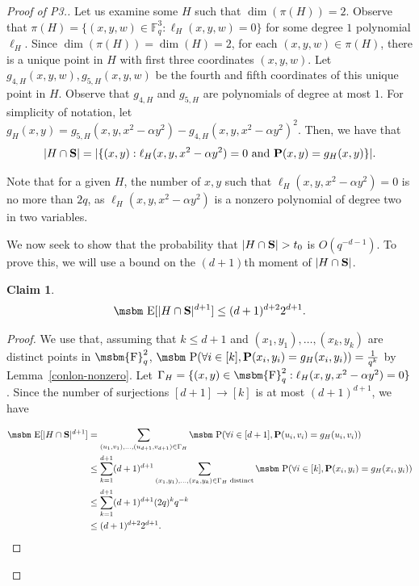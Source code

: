 \documentclass[12pt]{article}
\newtheorem{claim}[theorem]{Claim}
\newcommand{\FF}{\mbox{\msbm{F}}}
\newcommand{\PP}{\mbox{\msbm P}}
\newcommand{\EE}{\mbox{\msbm E}}
\begin{document}
\begin{proof}[Proof of P3.] Let us examine some $H$ such that $\dim(\pi(H)) = 2$. Observe that $\pi(H)=\{(x,y,w)\in \mathbb{F}_q^3: \ell_H(x,y,w)=0\}$ for some degree $1$ polynomial $\ell_H$. Since $\dim(\pi(H)) = \dim(H) = 2$, for each $(x, y, w) \in \pi(H)$, there is a unique point in $H$ with first three coordinates $(x,y,w)$. Let $g_{4, H}(x, y, w), g_{5, H}(x, y, w)$ be the fourth and fifth coordinates of this unique point in $H$. Observe that $g_{4, H}$ and $g_{5, H}$ are polynomials of degree at most $1$. For simplicity of notation, let $g_H(x, y) = g_{5, H}(x, y, x^2 - \alpha y^2) - g_{4, H}(x, y, x^2 - \alpha y^2)^2$. 
Then, we have that \begin{equation*}
    |H \cap \bold{S}| = |\{(x, y) : \ell_H(x, y, x^2 - \alpha y^2) = 0 \text{ and } \textbf{P}(x, y) = g_H(x, y)\}|.
\end{equation*}


Note that for a given $H$, the number of $x, y$ such that $\ell_H(x, y, x^2 - \alpha y^2) = 0$ is no more than $2q$, as $\ell_H(x, y, x^2 - \alpha y^2)$ is a nonzero polynomial of degree two in two variables. 



We now seek to show that the probability that $|H \cap \bold{S}| > t_0$ is $O(q^{- d - 1})$. To prove this, we will use a bound on the $(d + 1)$th moment of $|H \cap \bold{S}|$. 
\begin{claim}
    $$\EE[|H \cap \textbf{S}|^{d+1}] \leq (d + 1)^{d + 2}2^{ d+ 1}.$$
\end{claim}
\begin{proof}
    We use that, assuming that $k\leq d+1$ and $(x_1, y_1), \dots ,(x_k, y_k)$ are distinct points in $\FF_q^2$, $\PP(\forall i \in [k], \textbf{P}(x_i, y_i) = g_H(x_i, y_i)) =  \frac{1}{q^k}$ by Lemma~\ref{conlon-nonzero}. Let $\Gamma_H = \{ (x, y) \in \FF_q^2: \ell_H(x, y, x^2 - \alpha y^2) = 0\}$. Since the number of surjections $[d +1] \rightarrow [k]$ is at most $(d+1)^{d+1}$, we have

\begin{align*}
    \EE[|H \cap \bold{S}|^{d + 1}] &= \sum_{(u_1, v_1), \dots ,(u_{d + 1}, v_{d + 1}) \in \Gamma_H}\PP(\forall i \in [d + 1], \textbf{P}(u_i, v_i) = g_H(u_i, v_i) )\\
    &\leq \sum_{k = 1}^{ d + 1} (d+1)^{d+1}\sum_{(x_1, y_1), \dots ,(x_{k}, y_{k}) \in \Gamma_H \text{ distinct}}\PP(\forall i \in [k], \textbf{P}(x_i, y_i) = g_H(x_i, y_i))\\
    &\leq \sum_{k = 1}^{ d + 1} (d+1)^{d+1} (2q)^k q^{-k} \\
    &\leq (d + 1)^{d + 2} 2^{d + 1}. 
\end{align*}
\end{proof}


\end{proof}
\end{document}
